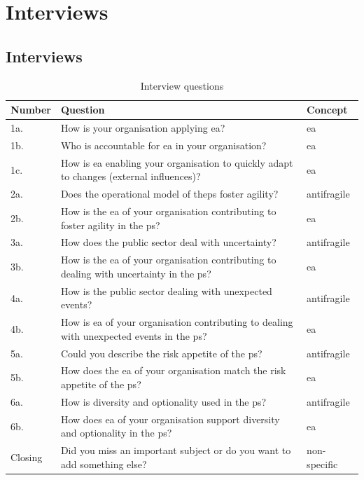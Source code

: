 \chapter{Interviews}
\label{ch:interviews}

\section{Interviews}
\label{sec:interviews}
\begin{table}[!h]
	\label{tab:interviewquestions}
	\begin{center}
		\begin{tabular}{@{}p{}p{}p{}@{}}
			\toprule
			\textbf{Number} & \textbf{Question} & \textbf{Concept} \\ \midrule %
			1a. & How is your organisation applying \acrshort{ea}? & \acrshort{ea} \\%
			1b. & Who is accountable for \acrshort{ea} in your organisation? & \acrshort{ea} \\%
			1c. & How is \acrshort{ea} enabling your organisation to quickly adapt to changes (external influences)? & \acrshort{ea} \\%
			2a. & Does the operational model of the\gls{ps} \gls{foster} \gls{agility}? & \Gls{antifragile} \\%
			2b. & How is the \acrshort{ea} of your organisation contributing to \gls{foster} \gls{agility} in the \gls{ps}? & \acrshort{ea} \\%
			3a. & How does the public sector deal with \gls{uncertainty}? & \Gls{antifragile} \\%
			3b. & How is the \acrshort{ea} of your organisation contributing to dealing with \gls{uncertainty} in the \gls{ps}?
			& \acrshort{ea} \\%
			4a. & How is the public sector dealing with unexpected events? & \Gls{antifragile} \\%
			4b. & How is \acrshort{ea} of your organisation contributing to dealing with unexpected events in the \gls{ps}? & \acrshort{ea} \\%
			5a. & Could you describe the risk appetite of the \gls{ps}? & \Gls{antifragile} \\%
			5b. & How does the \acrshort{ea} of your organisation match the risk appetite of the \gls{ps}?
			& \acrshort{ea} \\%
			6a. & How is \gls{diversity} and \gls{optionality} used in the \gls{ps}? & \Gls{antifragile} \\%
			6b. & How does \acrshort{ea} of your organisation support \gls{diversity} and \gls{optionality} in the \gls{ps}? & \acrshort{ea} \\%
			Closing & Did you miss an important subject or do you want to add something else? & non-specific \\%
			\bottomrule
		\end{tabular}
		\caption{Interview questions}
	\end{center}
\end{table}


